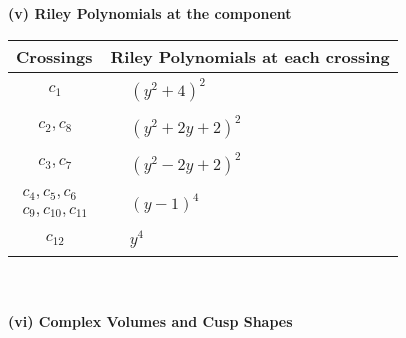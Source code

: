 \documentclass[1p]{elsarticle_modified}
\theoremstyle{definition}
\begin{document}
\newpage\renewcommand{\arraystretch}{1}
\flushleft \textbf{(v) Riley Polynomials at the component}\newline \\
\begin{tabular}{m{50pt}|m{274pt}}
Crossings & \hspace{64pt}Riley Polynomials at each crossing \\
\hline $$\begin{aligned}c_{1}\end{aligned}$$&$\begin{aligned}
&(y^2+4)^2
\end{aligned}$\\
\hline $$\begin{aligned}c_{2},c_{8}\end{aligned}$$&$\begin{aligned}
&(y^2+2 y+2)^2
\end{aligned}$\\
\hline $$\begin{aligned}c_{3},c_{7}\end{aligned}$$&$\begin{aligned}
&(y^2-2 y+2)^2
\end{aligned}$\\
\hline $$\begin{aligned}c_{4},c_{5},c_{6}\\c_{9},c_{10},c_{11}\end{aligned}$$&$\begin{aligned}
&(y-1)^4
\end{aligned}$\\
\hline $$\begin{aligned}c_{12}\end{aligned}$$&$\begin{aligned}
&y^4
\end{aligned}$\\
\hline
\end{tabular}\\~\\
\newpage\flushleft \textbf{(vi) Complex Volumes and Cusp Shapes}
\end{document}
